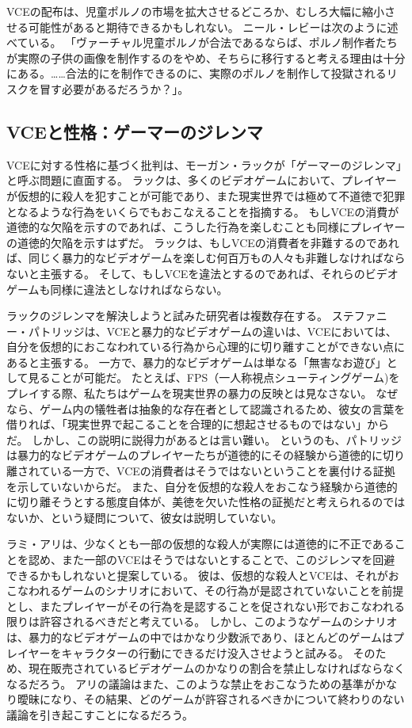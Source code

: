 \documentclass[paper=a4,book,openany]{jlreq}
\newcommand{\ig}[1]{}           %
\begin{document}
VCEの配布は、児童ポルノの市場を拡大させるどころか、むしろ大幅に縮小させる可能性があると期待できるかもしれない。
ニール・レビーは次のように述べている。
「ヴァーチャル児童ポルノが合法であるならば、ポルノ制作者たちが実際の子供の画像を制作するのをやめ、そちらに移行すると考える理由は十分にある。……合法的にを制作できるのに、実際のポルノを制作して投獄されるリスクを冒す必要があるだろうか？」\citep[p.320]{levy02:_virtual_child_pornog}\ig{Neil Levy}。

\subsection{VCEと性格：ゲーマーのジレンマ}

VCEに対する性格に基づく批判は、モーガン・ラックが「ゲーマーのジレンマ」と呼ぶ問題に直面する。
ラックは、多くのビデオゲームにおいて、プレイヤーが仮想的に殺人を犯すことが可能であり、また現実世界では極めて不道徳で犯罪となるような行為をいくらでもおこなえることを指摘する。
もしVCEの消費が道徳的な欠陥を示すのであれば、こうした行為を楽しむことも同様にプレイヤーの道徳的欠陥を示すはずだ。
ラックは、もしVCEの消費者を非難するのであれば、同じく暴力的なビデオゲームを楽しむ何百万もの人々も非難しなければならないと主張する。
そして、もしVCEを違法とするのであれば、それらのビデオゲームも同様に違法としなければならない\citep{luck09:_gamer_dilem}。

ラックのジレンマを解決しようと試みた研究者は複数存在する。
ステファニー・パトリッジは、VCEと暴力的なビデオゲームの違いは、VCEにおいては、自分を仮想的におこなわれている行為から心理的に切り離すことができない点にあると主張する。
一方で、暴力的なビデオゲームは単なる「無害なお遊び」として見ることが可能だ。
たとえば、FPS（一人称視点シューティングゲーム)をプレイする際、私たちはゲームを現実世界の暴力の反映とは見なさない。
なぜなら、ゲーム内の犠牲者は抽象的な存在者として認識されるため、彼女の言葉を借りれば、「現実世界で起こることを合理的に想起させるものではない」からだ\citep[p.33]{patridge13:_pornog_ethic_video_games}。
しかし、この説明に説得力があるとは言い難い。
というのも、パトリッジは暴力的なビデオゲームのプレイヤーたちが道徳的にその経験から道徳的に切り離されている一方で、VCEの消費者はそうではないということを裏付ける証拠を示していないからだ。
また、自分を仮想的な殺人をおこなう経験から道徳的に切り離そうとする態度自体が、美徳を欠いた性格の証拠だと考えられるのではないか、という疑問について、彼女は説明していない。

ラミ・アリは、少なくとも一部の仮想的な殺人が実際には道徳的に不正であることを認め、また一部のVCEはそうではないとすることで、このジレンマを回避できるかもしれないと提案している。
彼は、仮想的な殺人とVCEは、それがおこなわれるゲームのシナリオにおいて、その行為が是認されていないことを前提とし、またプレイヤーがその行為を是認することを促されない形でおこなわれる限りは許容されるべきだと考えている\citep{ali15:_new_solut_gamer_dilem}。
しかし、このようなゲームのシナリオは、暴力的なビデオゲームの中ではかなり少数派であり、ほとんどのゲームはプレイヤーをキャラクターの行動にできるだけ没入させようと試みる。
そのため、現在販売されているビデオゲームのかなりの割合を禁止しなければならなくなるだろう。
アリの議論はまた、このような禁止をおこなうための基準がかなり曖昧になり、その結果、どのゲームが許容されるべきかについて終わりのない議論を引き起こすことになるだろう。
\end{document}
